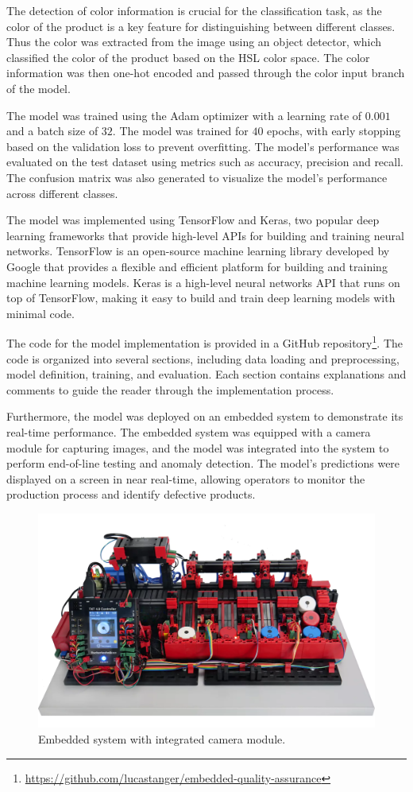 \documentclass[lettersize,journal]{IEEEtran}
\begin{document}
The detection of color information is crucial for the classification task, as the color of the product is a key feature for distinguishing between different classes. Thus the color was extracted from the image using an object detector, which classified the color of the product based on the HSL color space. The color information was then one-hot encoded and passed through the color input branch of the model.

The model was trained using the Adam optimizer with a learning rate of $0.001$ and a batch size of $32$. The model was trained for $40$ epochs, with early stopping based on the validation loss to prevent overfitting. The model's performance was evaluated on the test dataset using metrics such as accuracy, precision and recall. The confusion matrix was also generated to visualize the model's performance across different classes.

The model was implemented using TensorFlow and Keras, two popular deep learning frameworks that provide high-level APIs for building and training neural networks. TensorFlow is an open-source machine learning library developed by Google that provides a flexible and efficient platform for building and training machine learning models. Keras is a high-level neural networks API that runs on top of TensorFlow, making it easy to build and train deep learning models with minimal code.

The code for the model implementation is provided in a GitHub repository\footnote{\url{https://github.com/lucastanger/embedded-quality-assurance}}. The code is organized into several sections, including data loading and preprocessing, model definition, training, and evaluation. Each section contains explanations and comments to guide the reader through the implementation process.

Furthermore, the model was deployed on an embedded system to demonstrate its real-time performance. The embedded system was equipped with a camera module for capturing images, and the model was integrated into the system to perform end-of-line testing and anomaly detection. The model's predictions were displayed on a screen in near real-time, allowing operators to monitor the production process and identify defective products.

\begin{figure}[!h]
  \centering
  \includegraphics[width=.4\textwidth]{images/ft-board.png}
  \caption{Embedded system with integrated camera module.}
  
  \label{fig:embeded_system}
\end{figure}
\end{document}
